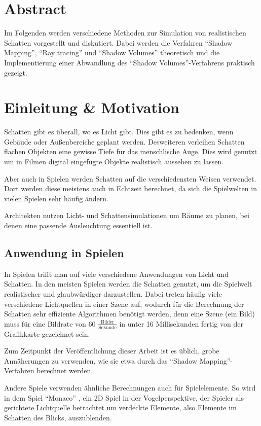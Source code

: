 \section{Abstract}

Im Folgenden werden verschiedene Methoden zur Simulation von realistischen Schatten
vorgestellt und diskutiert. Dabei werden die Verfahren "`Shadow Mapping"',
"`Ray tracing"' und "`Shadow Volumes"' theoretisch und die Implementierung
einer Abwandlung des "`Shadow Volumes"'-Verfahrens praktisch gezeigt.


\section{Einleitung \& Motivation}

Schatten gibt es überall, wo es Licht gibt. Dies gibt es zu bedenken, wenn
Gebäude oder Außenbereiche geplant werden.
Desweiteren verleihen Schatten flachen Objekten eine gewisse Tiefe für das menschlische Auge.
Dies wird genutzt um in Filmen digital eingefügte Objekte realistisch aussehen zu lassen.

Aber auch in Spielen werden Schatten auf die verschiedensten Weisen verwendet. Dort werden
diese meistens auch in Echtzeit berechnet, da sich die Spielwelten in vielen Spielen sehr
häufig ändern.

Architekten nutzen Licht- und Schattensimulationen um Räume zu planen, bei denen eine passende
Ausleuchtung essentiell ist.

\subsection*{Anwendung in Spielen}

In Spielen trifft man auf viele verschiedene Anwendungen von Licht und Schatten. In den meisten
Spielen werden die Schatten genutzt, um die Spielwelt realistischer und glaubwürdiger darzustellen.
Dabei treten häufig viele verschiedene Lichtquellen in einer Szene auf, wodurch für die Berechnung der
Schatten sehr effiziente Algorithmen benötigt werden, denn eine Szene (ein Bild) muss für eine Bildrate
von 60 $\frac{\text{Bilder}}{\text{Sekunde}}$ in unter 16 Millisekunden fertig von der Grafikkarte gezeichnet sein.

Zum Zeitpunkt der Veröffentlichung dieser Arbeit ist es üblich, grobe Annäherungen zu verwenden,
wie sie etwa durch das "`Shadow Mapping"'-Verfahren berechnet werden.

Andere Spiele verwenden ähnliche Berechnungen auch für Spielelemente. So wird in dem Spiel "`Monaco"' \cite{monaco2014},
ein 2D Spiel in der Vogelperspektive, der Spieler als gerichtete Lichtquelle betrachtet um verdeckte
Elemente, also Elemente im Schatten des Blicks, auszublenden.

